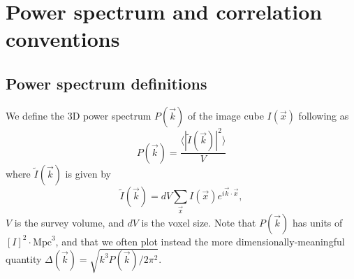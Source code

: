 \documentclass{emulateapj}
\begin{document}
\section{Power spectrum and correlation conventions}
\label{sec:pspecconventions}

\subsection{Power spectrum definitions}
\label{sec:pspecdefs}

We define the 3D power spectrum $P(\vec{k})$ of the image cube $I(\vec{x})$ following \citet{ewallwice14} as 
\begin{equation}
\label{eqn:pspec3Ddef}
	P(\vec{k}) = \frac{\langle|\tilde{I}(\vec{k})|^2\rangle}{V}
\end{equation}
where $\tilde{I}(\vec{k})$ is given by
\begin{equation}
	\tilde{I}(\vec{k})=dV\sum_{\vec{x}}I(\vec{x})e^{i\vec{k}\cdot\vec{x}},
\end{equation}
$V$ is the survey volume, and $dV$ is the voxel size. Note that $P(\vec{k})$ has units of $[I]^2\cdot\text{Mpc}^3$, and that we often plot instead the more dimensionally-meaningful quantity $\Delta(\vec{k})=\sqrt{k^3P(\vec{k})/2\pi^2}$.
\end{document}
